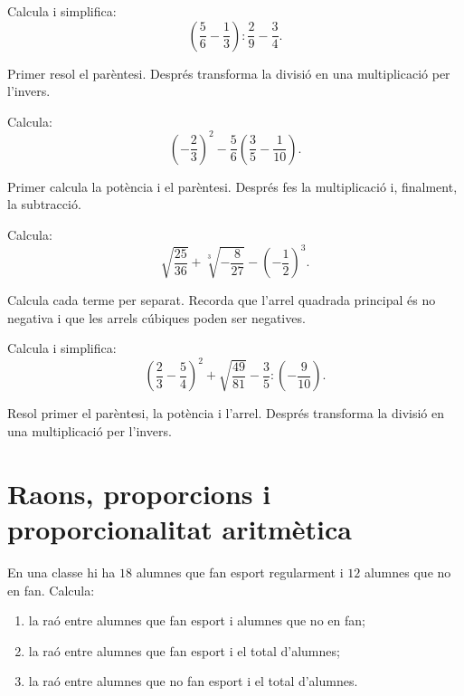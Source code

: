\begin{exercici}
	Calcula i simplifica:
	\[
	\left(\frac{5}{6}-\frac{1}{3}\right):\frac{2}{9}-\frac{3}{4}.
	\]
\end{exercici}

\begin{indicacio}
	Primer resol el parèntesi. Després transforma la divisió en una multiplicació per l'invers.
\end{indicacio}

\begin{exercici}
	Calcula:
	\[
	\left(-\frac{2}{3}\right)^2
	-
	\frac{5}{6}\left(\frac{3}{5}-\frac{1}{10}\right).
	\]
\end{exercici}

\begin{indicacio}
	Primer calcula la potència i el parèntesi. Després fes la multiplicació i, finalment, la subtracció.
\end{indicacio}

\begin{exercici}
	Calcula:
	\[
	\sqrt{\frac{25}{36}}
	+
	\sqrt[3]{-\frac{8}{27}}
	-
	\left(-\frac{1}{2}\right)^3.
	\]
\end{exercici}

\begin{indicacio}
	Calcula cada terme per separat. Recorda que l'arrel quadrada principal és no negativa i que les arrels cúbiques poden ser negatives.
\end{indicacio}

\begin{exercici}
	Calcula i simplifica:
	\[
	\left(\frac{2}{3}-\frac{5}{4}\right)^2
	+
	\sqrt{\frac{49}{81}}
	-
	\frac{3}{5}:\left(-\frac{9}{10}\right).
	\]
\end{exercici}

\begin{indicacio}
	Resol primer el parèntesi, la potència i l'arrel. Després transforma la divisió en una multiplicació per l'invers.
\end{indicacio}

\section{Raons, proporcions i proporcionalitat aritmètica}

\begin{exercici}[Raons]
	En una classe hi ha \(18\) alumnes que fan esport regularment i \(12\) alumnes que no en fan. Calcula:
	\begin{enumerate}[label=\alph*)]
		\item la raó entre alumnes que fan esport i alumnes que no en fan;
		\item la raó entre alumnes que fan esport i el total d'alumnes;
		\item la raó entre alumnes que no fan esport i el total d'alumnes.
	\end{enumerate}
\end{exercici}

